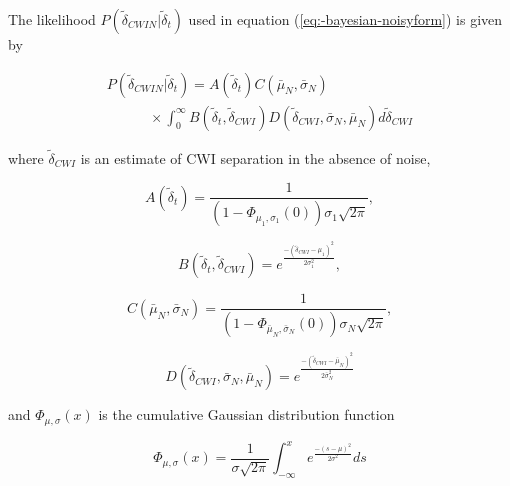 \documentclass[12pt,double]{article}
\begin{document}
The likelihood $P(\widetilde{\delta}_{CWIN}|\widetilde{\delta}_t)$
used in equation (\ref{eq:-bayesian-noisyform}) is given by
\begin{linenomath*} \begin{equation}
\begin{array}{l}
\label{eq-likelihood-int}
P(\widetilde{\delta}_{CWIN}|\widetilde{\delta}_t)  =
A(\widetilde{\delta}_t) C(\bar{\mu}_N, \bar{\sigma}_N)  \\
\hspace{3em} \times \int_0^\infty
B(\widetilde{\delta}_t,\widetilde{\delta}_{CWI})
D(\widetilde{\delta}_{CWI},\bar{\sigma}_N,\bar{\mu}_N )
d\widetilde{\delta}_{CWI}
\end{array}
\end{equation} \end{linenomath*}
where $\widetilde{\delta}_{CWI}$ is an estimate of CWI separation in the absence
of noise,
\begin{linenomath*} \begin{equation}
\label{eq:Adefn}
A(\widetilde{\delta}_t) = \frac{1}{(1-\Phi_{\mu_1,\sigma_1}(0))\sigma_1\sqrt{2\pi} },
\end{equation} \end{linenomath*}
\begin{linenomath*} \begin{equation}
B(\widetilde{\delta}_t,\widetilde{\delta}_{CWI})=e^{  \frac{-(\widetilde{\delta}_{CWI}-\mu_1)^2}{2\sigma_1^2} },
\end{equation} \end{linenomath*}
\begin{linenomath*} \begin{equation}
\label{eq:Cdefn}
C(\bar{\mu}_N, \bar{\sigma}_N) =  \frac{1}{(1-\Phi_{\bar{\mu}_N,\bar{\sigma}_N}(0))\sigma_N\sqrt{2\pi}},
\end{equation} \end{linenomath*}
\begin{linenomath*} \begin{equation}
D(\widetilde{\delta}_{CWI},\bar{\sigma}_N,\bar{\mu}_N )=e^{  \frac{-(\widetilde{\delta}_{CWI}-\bar{\mu}_N)^2}{2 \bar{\sigma}_N ^2} }
\end{equation} \end{linenomath*}
and $\Phi_{\mu,\sigma}(x)$ is the cumulative Gaussian distribution function
\begin{linenomath*} \begin{equation}
\label{eq-cummulative-Gaussian}
\Phi_{\mu,\sigma}(x) = \frac{1}{\sigma \sqrt{2 \pi}}
\int_{-\infty}^x e^{  \frac{-(s-\mu)^2}{2\sigma^2}  } ds
\end{equation} \end{linenomath*}
\end{document}
